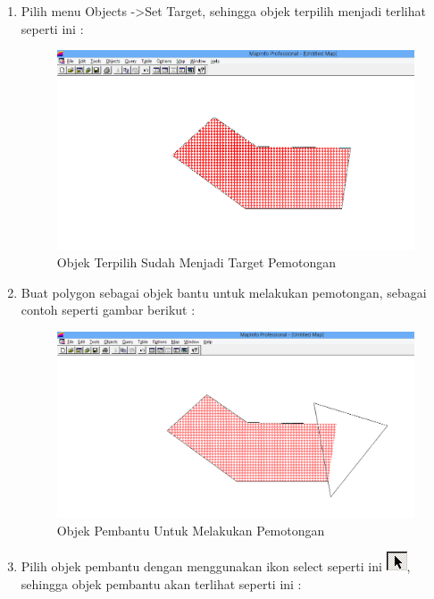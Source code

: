 \begin{enumerate}[\bfseries A.]
\begin{enumerate}[1.]
    \item Pilih menu Objects -\textgreater Set Target, sehingga objek terpilih menjadi terlihat seperti ini :
    
    \begin{figure}[H]
      \centering
      \includegraphics[width=1\textwidth]{./resources/026-objek-tertarget-untuk-erase}
      \caption{Objek Terpilih Sudah Menjadi Target Pemotongan}
    \end{figure}
    
    \item Buat polygon sebagai objek bantu untuk melakukan pemotongan, sebagai contoh seperti gambar berikut :
    
    \begin{figure}[H]
      \centering
      \includegraphics[width=1\textwidth]{./resources/027-objek-pembantu-erase}
      \caption{Objek Pembantu Untuk Melakukan Pemotongan}
    \end{figure}
    
    \item Pilih objek pembantu dengan menggunakan ikon select seperti ini \includegraphics{./resources/008-ikon-select}, sehingga objek pembantu akan terlihat seperti ini :
    

\end{enumerate}
\end{enumerate}
